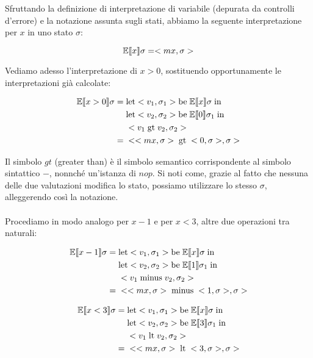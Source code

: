     Sfruttando la definizione di interpretazione di variabile (depurata da controlli d'errore) e la notazione assunta sugli stati, abbiamo la seguente interpretazione per $x$ in uno stato $\sigma$:
    
    \begin{equation*}
        \mathbb{E}\llbracket x \rrbracket\sigma = <mx, \sigma>
    \end{equation*}
    
    Vediamo adesso l'interpretazione di $x>0$, sostituendo opportunamente le interpretazioni già calcolate:
    
    \begin{align*}
        \mathbb{E}\llbracket x>0 \rrbracket\sigma =\;& \mbox{let} <v_1,\sigma_1> \mbox{be}\; \mathbb{E}\llbracket x \rrbracket\sigma\; \mbox{in}\;\\
        &\mbox{let} <v_2,\sigma_2> \mbox{be}\; \mathbb{E}\llbracket 0 \rrbracket\sigma_1\; \mbox{in}\;\\
        &<v_1\; \mbox{gt}\; v_2, \sigma_2>\\
        =\;& <<mx,\sigma>\; \mbox{gt}\; <0, \sigma>, \sigma>
    \end{align*}
    
    Il simbolo $gt$ (greater than) è il simbolo semantico corrispondente al simbolo sintattico $-$, nonnché un'istanza di $nop$. Si noti come, grazie al fatto che nessuna delle due valutazioni modifica lo stato, possiamo utilizzare lo stesso $\sigma$, alleggerendo così la notazione.\\
    \\
    Procediamo in modo analogo per $x-1$ e per $x<3$, altre due operazioni tra naturali:
    
    \begin{align*}
        \mathbb{E}\llbracket x-1 \rrbracket\sigma =\;& \mbox{let} <v_1,\sigma_1> \mbox{be}\; \mathbb{E}\llbracket x \rrbracket\sigma\; \mbox{in}\;\\
        &\mbox{let} <v_2,\sigma_2> \mbox{be}\; \mathbb{E}\llbracket 1 \rrbracket\sigma_1\; \mbox{in}\;\\
        &<v_1\; \mbox{minus}\; v_2, \sigma_2>\\
        =\;& <<mx,\sigma>\; \mbox{minus}\; <1, \sigma>, \sigma>
    \end{align*}
    
    \begin{align*}
        \mathbb{E}\llbracket x<3 \rrbracket\sigma =\;& \mbox{let} <v_1,\sigma_1> \mbox{be}\; \mathbb{E}\llbracket x \rrbracket\sigma\; \mbox{in}\;\\
        &\mbox{let} <v_2,\sigma_2> \mbox{be}\; \mathbb{E}\llbracket 3 \rrbracket\sigma_1\; \mbox{in}\;\\
        &<v_1\; \mbox{lt}\; v_2, \sigma_2>\\
        =\;& <<mx,\sigma>\; \mbox{lt}\; <3, \sigma>, \sigma>
    \end{align*}
    
